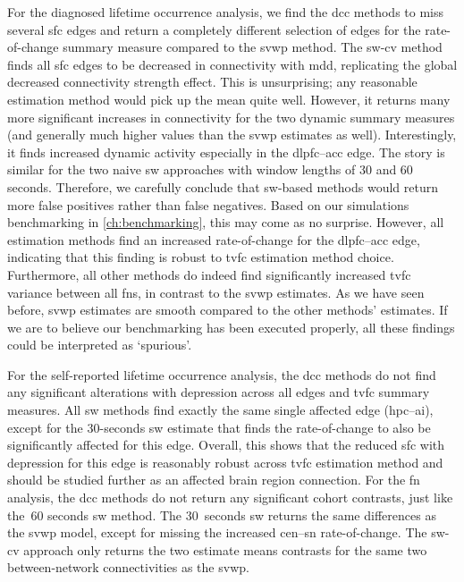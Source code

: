 For the diagnosed lifetime occurrence analysis, we find the \gls{dcc} methods to miss several \gls{sfc} edges and return a completely different selection of edges for the rate-of-change summary measure compared to the \gls{svwp} method.
%
The \gls{sw-cv} method finds all \gls{sfc} edges to be decreased in connectivity with \gls{mdd}, replicating the global decreased connectivity strength effect.
This is unsurprising; any reasonable estimation method would pick up the mean quite well.
However, it returns many more significant increases in connectivity for the two dynamic summary measures (and generally much higher values than the \gls{svwp} estimates as well).
Interestingly, it finds increased dynamic activity especially in the \gls{dlpfc}--\gls{acc} edge.
%
The story is similar for the two naive \gls{sw} approaches with window lengths of 30 and 60 seconds.
Therefore, we carefully conclude that \gls{sw}-based methods would return more false positives rather than false negatives.
Based on our simulations benchmarking in \cref{ch:benchmarking}, this may come as no surprise.
%
However, all estimation methods find an increased rate-of-change for the \gls{dlpfc}--\gls{acc} edge, indicating that this finding is robust to \gls{tvfc} estimation method choice.
%
Furthermore, all other methods do indeed find significantly increased \gls{tvfc} variance between all \glspl{fn}, in contrast to the \gls{svwp} estimates.
As we have seen before, \gls{svwp} estimates are smooth compared to the other methods' estimates.
If we are to believe our benchmarking has been executed properly, all these findings could be interpreted as `spurious'.

For the self-reported lifetime occurrence analysis, the \gls{dcc} methods do not find any significant alterations with depression across all edges and \gls{tvfc} summary measures.
%
All \gls{sw} methods find exactly the same single affected edge (\gls{hpc}--\gls{ai}), except for the 30-seconds \gls{sw} estimate that finds the rate-of-change to also be significantly affected for this edge.
%
Overall, this shows that the reduced \gls{sfc} with depression for this edge is reasonably robust across \gls{tvfc} estimation method and should be studied further as an affected brain region connection.
%
For the \gls{fn} analysis, the \gls{dcc} methods do not return any significant cohort contrasts, just like the~60 seconds \gls{sw} method.
The 30~seconds \gls{sw} returns the same differences as the \gls{svwp} model, except for missing the increased \gls{cen}--\gls{sn} rate-of-change.
The \gls{sw-cv} approach only returns the two estimate means contrasts for the same two between-network connectivities as the \gls{svwp}.

